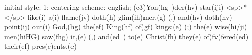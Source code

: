 initial-style: 1;
centering-scheme: english;
(c3)Yon(hg~)der(hv) star(iji) <sp>*</sp> like(i) a(i) flame(jv) doth(h) glim(ih)mer,(g) (,) and(hv) doth(hv) point(ij) out(i) God,(hg) the(ef) King(hf) of(gf) kings:(e) (;) the(e) wise(hi/ji) men(hiHG) saw(fhg) it,(e) (,) and(ed~) to(e) Christ(fh) they(e) of(fv)fered(ed) their(ef) pres(e)ents.(e)
